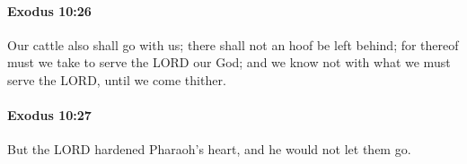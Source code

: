 		\paragraph{Exodus 10:26} %
			\label{EXODUS-10-26}

			Our cattle also shall go with us; there shall not an hoof be left behind; for thereof must we take to serve the LORD our God; and we know not with what we must serve the LORD, until we come thither.


		\paragraph{Exodus 10:27} %
			\label{EXODUS-10-27}

			But the LORD hardened Pharaoh's heart, and he would not let them go.



